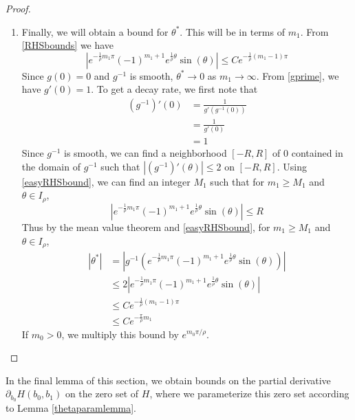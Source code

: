 \documentclass[thesis.tex]{subfiles}
\begin{document}
\begin{lemma}
\begin{proof}
\begin{enumerate}
	\item Finally, we will obtain a bound for $\theta^*$. This will be in terms of $m_1$. From \eqref{RHSbounds} we have
	\begin{equation}\label{easyRHSbound}
	|e^{ -\frac{1}{\rho} m_1 \pi } (-1)^{m_1 + 1}  e^{ \frac{1}{\rho} \theta } \sin(\theta)| \leq C e^{ -\frac{1}{\rho}(m_1 - 1) \pi }
	\end{equation}
	Since $g(0) = 0$ and $g^{-1}$ is smooth, $\theta^* \rightarrow 0$ as $m_1 \rightarrow \infty$. From \eqref{gprime}, we have $g'(0) = 1$. To get a decay rate, we first note that
	\begin{align*}
	(g^{-1})'(0) &= \frac{1}{g'(g^{-1}(0))} \\
	&= \frac{1}{g'(0)} \\
	&= 1
	\end{align*}
	Since $g^{-1}$ is smooth, we can find a neighborhood $[-R, R]$ of 0 contained in the domain of $g^{-1}$ such that $|(g^{-1})'(\theta)| \leq 2$ on $[-R, R]$. Using \eqref{easyRHSbound}, we can find an integer $M_1$ such that for $m_1 \geq M_1$ and $\theta \in I_\rho$,
	\begin{equation}\label{easyRHSbound}
	|e^{ -\frac{1}{\rho} m_1 \pi } (-1)^{m_1 + 1}  e^{ \frac{1}{\rho} \theta } \sin(\theta)| \leq R
	\end{equation}
	Thus by the mean value theorem and \eqref{easyRHSbound}, for $m_1 \geq M_1$ and $\theta \in I_\rho$,
	\begin{align*}
	|\theta^*| &= | g^{-1}(e^{ -\frac{1}{\rho} m_1 \pi } (-1)^{m_1 + 1}  e^{ \frac{1}{\rho} \theta } \sin(\theta)) | \\
	&\leq 2 |e^{ -\frac{1}{\rho} m_1 \pi } (-1)^{m_1 + 1}  e^{ \frac{1}{\rho} \theta } \sin(\theta)| \\
	&\leq C e^{ -\frac{1}{\rho}(m_1 - 1) \pi } \\
	&\leq C e^{ -\frac{\pi}{\rho} m_1 }
	\end{align*}
	If $m_0 > 0$, we multiply this bound by $e^{m_0 \pi/\rho}$.
\end{enumerate}
\end{proof}
\end{lemma}

In the final lemma of this section, we obtain bounds on the partial derivative $\partial_{b_0} H(b_0, b_1)$ on the zero set of $H$, where we parameterize this zero set according to Lemma \ref{thetaparamlemma}.

\end{document}

